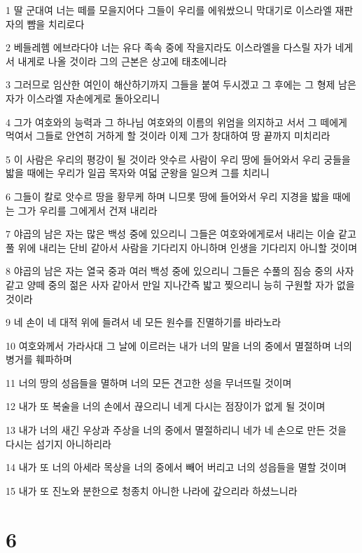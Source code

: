 \par 1 딸 군대여 너는 떼를 모을지어다 그들이 우리를 에워쌌으니 막대기로 이스라엘 재판자의 뺨을 치리로다
\par 2 베들레헴 에브라다야 너는 유다 족속 중에 작을지라도 이스라엘을 다스릴 자가 네게서 내게로 나올 것이라 그의 근본은 상고에 태초에니라
\par 3 그러므로 임산한 여인이 해산하기까지 그들을 붙여 두시겠고 그 후에는 그 형제 남은 자가 이스라엘 자손에게로 돌아오리니
\par 4 그가 여호와의 능력과 그 하나님 여호와의 이름의 위엄을 의지하고 서서 그 떼에게 먹여서 그들로 안연히 거하게 할 것이라 이제 그가 창대하여 땅 끝까지 미치리라
\par 5 이 사람은 우리의 평강이 될 것이라 앗수르 사람이 우리 땅에 들어와서 우리 궁들을 밟을 때에는 우리가 일곱 목자와 여덟 군왕을 일으켜 그를 치리니
\par 6 그들이 칼로 앗수르 땅을 황무케 하며 니므롯 땅에 들어와서 우리 지경을 밟을 때에는 그가 우리를 그에게서 건져 내리라
\par 7 야곱의 남은 자는 많은 백성 중에 있으리니 그들은 여호와에게로서 내리는 이슬 같고 풀 위에 내리는 단비 같아서 사람을 기다리지 아니하며 인생을 기다리지 아니할 것이며
\par 8 야곱의 남은 자는 열국 중과 여러 백성 중에 있으리니 그들은 수풀의 짐승 중의 사자 같고 양떼 중의 젊은 사자 같아서 만일 지나간즉 밟고 찢으리니 능히 구원할 자가 없을 것이라
\par 9 네 손이 네 대적 위에 들려서 네 모든 원수를 진멸하기를 바라노라
\par 10 여호와께서 가라사대 그 날에 이르러는 내가 너의 말을 너의 중에서 멸절하며 너의 병거를 훼파하며
\par 11 너의 땅의 성읍들을 멸하며 너의 모든 견고한 성을 무너뜨릴 것이며
\par 12 내가 또 복술을 너의 손에서 끊으리니 네게 다시는 점장이가 없게 될 것이며
\par 13 내가 너의 새긴 우상과 주상을 너의 중에서 멸절하리니 네가 네 손으로 만든 것을 다시는 섬기지 아니하리라
\par 14 내가 또 너의 아세라 목상을 너의 중에서 빼어 버리고 너의 성읍들을 멸할 것이며
\par 15 내가 또 진노와 분한으로 청종치 아니한 나라에 갚으리라 하셨느니라

\chapter{6}

